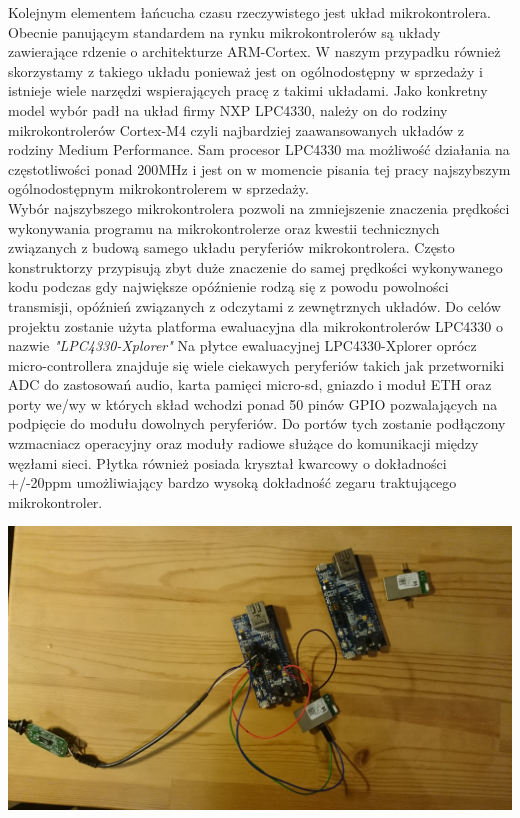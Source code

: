 Kolejnym elementem łańcucha czasu rzeczywistego jest układ mikrokontrolera. Obecnie panującym standardem na rynku mikrokontrolerów są układy zawierające rdzenie o architekturze ARM-Cortex. W naszym przypadku również skorzystamy z takiego układu ponieważ jest on ogólnodostępny w sprzedaży i istnieje wiele narzędzi wspierających pracę z takimi układami. Jako konkretny model wybór padł na układ firmy NXP LPC4330, należy on do rodziny mikrokontrolerów Cortex-M4 czyli najbardziej zaawansowanych układów z rodziny Medium Performance. Sam procesor LPC4330 ma możliwość działania na częstotliwości ponad 200MHz i jest on w momencie pisania tej pracy najszybszym ogólnodostępnym mikrokontrolerem w sprzedaży. \\
Wybór najszybszego mikrokontrolera pozwoli na zmniejszenie znaczenia prędkości wykonywania programu na mikrokontrolerze oraz kwestii technicznych związanych z budową samego układu peryferiów mikrokontrolera. Często konstruktorzy przypisują zbyt duże znaczenie do samej prędkości wykonywanego kodu podczas gdy największe opóźnienie rodzą się z powodu powolności transmisji, opóźnień związanych z odczytami z zewnętrznych układów. Do celów projektu zostanie użyta platforma ewaluacyjna dla mikrokontrolerów LPC4330 o nazwie \textit{"LPC4330-Xplorer"}
Na płytce ewaluacyjnej LPC4330-Xplorer oprócz micro-controllera znajduje się wiele ciekawych peryferiów takich jak przetworniki ADC do zastosowań audio, karta pamięci micro-sd, gniazdo i moduł ETH oraz porty we/wy w których skład wchodzi ponad 50 pinów GPIO pozwalających na podpięcie do modułu dowolnych peryferiów. Do portów tych zostanie podłączony wzmacniacz operacyjny oraz moduły radiowe służące do komunikacji między węzłami sieci. Płytka również posiada kryształ kwarcowy o dokładności +/-20ppm umożliwiający bardzo wysoką dokładność zegaru traktującego mikrokontroler.\\

\centerline{\includegraphics[scale=0.10]{./img/target_system/lpc4330-xplorer.jpg}} 

